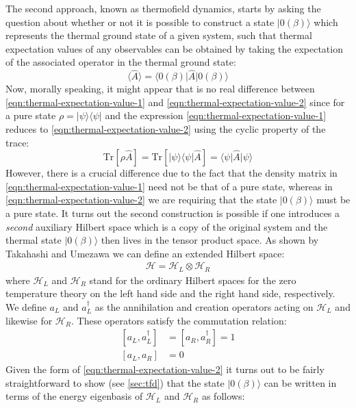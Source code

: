 \documentclass[twocolumn,draft,aps,nofootinbib,nobibnotes,final]{revtex4-2}
\newcommand{\mc}[1]{\mathcal{#1}}
\newcommand{\expect}[1]{\langle #1\rangle}
\newcommand{\expectop}[3]{\langle #1 \vert #2 \vert #3 \rangle}
\newcommand{\bra}[1]{\langle #1 \vert}
\newcommand{\ket}[1]{\vert #1 \rangle}
\newcommand{\Tr}{\mathrm{Tr}}
\begin{document}
The second approach, known as thermofield dynamics, starts by asking the question about whether or not it is possible to construct a state $ \ket{0(\beta)} $ which represents the thermal ground state of a given system, such that thermal expectation values of any observables can be obtained by taking the expectation of the associated operator in the thermal ground state:
\begin{equation}\label{eqn:thermal-expectation-value-2}
	\expect{\hat A} = \expectop{0(\beta)}{\hat A}{0(\beta)}
\end{equation}
Now, morally speaking, it might appear that is no real difference between \eqref{eqn:thermal-expectation-value-1} and \eqref{eqn:thermal-expectation-value-2} since for a pure state $ \rho = \ket{\psi}\bra{\psi} $ and the expression \eqref{eqn:thermal-expectation-value-1} reduces to \eqref{eqn:thermal-expectation-value-2} using the cyclic property of the trace:
\begin{equation*}
	\Tr[\rho \hat A] = \Tr[\ket{\psi}\bra{\psi} \hat A] = \bra{\psi} \hat A \ket{\psi}
\end{equation*}
However, there is a crucial difference due to the fact that the density matrix in \eqref{eqn:thermal-expectation-value-1} need not be that of a pure state, whereas in \eqref{eqn:thermal-expectation-value-2} we are requiring that the state $ \ket{0(\beta)} $ must be a pure state. It turns out the second construction is possible if one introduces a \emph{second} auxiliary Hilbert space which is a copy of the original system and the thermal state $ \ket{0(\beta)} $ then lives in the tensor product space. As shown by Takahashi and Umezawa \cite{Takahashi1996Thermo} we can define an extended Hilbert space:
\begin{align}
	\mc{H} = \mc{H}_{L}\otimes \mc{H}_{R}
\end{align}
where $\mc H_{L}$ and $ \mc H_{R}$ stand for the ordinary Hilbert spaces for the zero temperature theory on the left hand side and the right hand side, respectively. We define $a_{L} $ and $a_{L}^{\dagger}$ as the annihilation and creation operators acting on $ \mc H_L $ and likewise for $ \mc H_R $. These operators satisfy the commutation relation:
\begin{align}\label{eqn:ladder-ops}
	[a_{L},a_{L}^{\dagger}] &= [a_{R},a_{R}^{\dagger}] = 1 \\
	[a_{L},a_{R}] &= 0
\end{align}
Given the form of \eqref{eqn:thermal-expectation-value-2} it turns out to be fairly straightforward to show (see \autoref{sec:tfd}) that the state $ \ket{0(\beta)} $ can be written in terms of the energy eigenbasis of $ \mc H_L $ and $ \mc H_R $ as follows:
\end{document}
